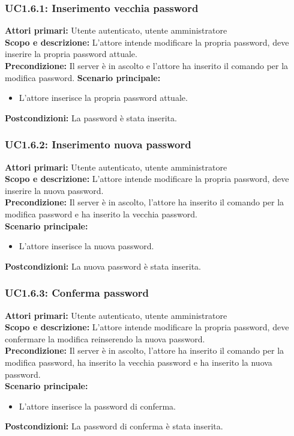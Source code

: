 \documentclass{scalatekids-article}
\begin{document}
\subsubsection{UC1.6.1: Inserimento vecchia password}

\textbf{Attori primari:} Utente autenticato, utente amministratore\\
\textbf{Scopo e descrizione:} L'attore intende modificare la propria password, deve inserire la propria password attuale.\\
\textbf{Precondizione:} Il server è in ascolto e l'attore ha inserito il comando per la modifica password.
\textbf{Scenario principale:}
\begin{itemize}
\item L'attore inserisce la propria password attuale.
\end{itemize}
\textbf{Postcondizioni:} La password è stata inserita.

\subsubsection{UC1.6.2: Inserimento nuova password}

\textbf{Attori primari:} Utente autenticato, utente amministratore\\
\textbf{Scopo e descrizione:} L'attore intende modificare la propria password, deve inserire la nuova password.\\
\textbf{Precondizione:} Il server è in ascolto, l'attore ha inserito il comando per la modifica password e ha inserito la vecchia password.\\
\textbf{Scenario principale:}
\begin{itemize}
\item L'attore inserisce la nuova password.
\end{itemize}
\textbf{Postcondizioni:} La nuova password è stata inserita.

\subsubsection{UC1.6.3: Conferma password}

\textbf{Attori primari:} Utente autenticato, utente amministratore\\
\textbf{Scopo e descrizione:} L'attore intende modificare la propria password, deve confermare la modifica reinserendo la nuova password.\\
\textbf{Precondizione:} Il server è in ascolto, l'attore ha inserito il comando per la modifica password, ha inserito la vecchia password e ha inserito la nuova password.\\
\textbf{Scenario principale:}
\begin{itemize}
\item L'attore inserisce la password di conferma.
\end{itemize}
\textbf{Postcondizioni:} La password di conferma è stata inserita.
\end{document}
